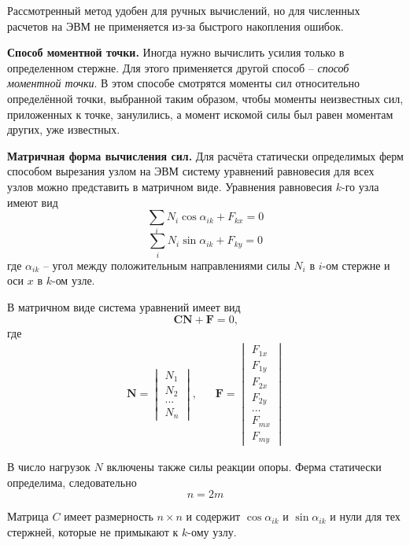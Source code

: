 \documentclass[a4paper,12pt]{article}
\begin{document}
Рассмотренный метод удобен для ручных вычислений, но для численных расчетов на ЭВМ не применяется из-за быстрого накопления ошибок.

\textbf{Способ моментной точки.} Иногда нужно вычислить усилия только в определенном стержне. Для этого применяется другой способ -- \textit{способ моментной точки}. В этом способе смотрятся моменты сил относительно определённой точки, выбранной таким образом, чтобы моменты неизвестных сил, приложенных к точке, занулились, а момент  искомой силы был равен моментам других, уже известных.   

\textbf{Матричная форма вычисления сил.} Для расчёта статически определимых ферм способом вырезания узлом на ЭВМ систему уравнений равновесия для всех узлов можно представить в матричном виде. Уравнения равновесия $k$-го узла имеют вид
\[\sum_i N_i \cos \alpha_{ik} + F_{kx} = 0\]
\[\sum_i N_i \sin \alpha_{ik} + F_{ky} = 0\]
где $\alpha_{ik}$ -- угол между положительным направлениями силы $N_i$ в $i$-ом стержне и оси $x$ в $k$-ом узле.

В матричном виде система уравнений имеет вид
\[\mathbf{CN + F} = 0 \text{,}\]
где 
\begin{equation}
    \begin{aligned}
        \mathbf{N} = \begin{vmatrix}
            N_1 \\
            N_2 \\ 
            ... \\
            N_n
        \end{vmatrix} \text{,}\quad & 
        \mathbf{F} = \begin{vmatrix}
                F_{1x} \\
                F_{1y} \\
                F_{2x} \\
                F_{2y} \\ 
                ... \\
                F_{mx} \\
                F_{my}
            \end{vmatrix}
    \end{aligned}
\end{equation}

В число нагрузок $N$ включены также силы реакции опоры. Ферма статически определима, следовательно 
\[n = 2m\]

Матрица $C$ имеет размерность $n \times n$ и содержит $\cos \alpha_{ik}$ и $\sin \alpha_{ik}$ и нули для тех стержней, которые не примыкают к $k$-ому узлу.
\end{document}
